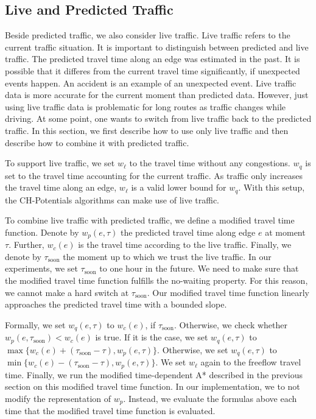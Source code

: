 \documentclass[letterpaper]{article} %
\begin{document}
\subsection{Live and Predicted Traffic}
\label{sec:live-predicted-traffic}

Beside predicted traffic, we also consider live traffic.
Live traffic refers to the current traffic situation.
It is important to distinguish between predicted and live traffic.
The predicted travel time along an edge was estimated in the past.
It is possible that it differes from the current travel time significantly, if unexpected events happen.
An accident is an example of an unexpected event.
Live traffic data is more accurate for the current moment than predicted data.
However, just using live traffic data is problematic for long routes as traffic changes while driving.
At some point, one wants to switch from live traffic back to the predicted traffic.
In this section, we first describe how to use only live traffic and then describe how to combine it with predicted traffic.

To support live traffic, we set $w_\ell$ to the travel time without any congestions.
$w_q$ is set to the travel time accounting for the current traffic.
As traffic only increases the travel time along an edge, $w_\ell$ is a valid lower bound for $w_q$.
With this setup, the CH-Potentials algorithms can make use of live traffic.

To combine live traffic with predicted traffic, we define a modified travel time function.
Denote by $w_p(e,\tau)$ the predicted travel time along edge $e$ at moment $\tau$.
Further, $w_c(e)$ is the travel time according to the live traffic.
Finally, we denote by $\tau_{\mathrm{soon}}$ the moment up to which we trust the live traffic.
In our experiments, we set $\tau_{\mathrm{soon}}$ to one hour in the future.
We need to make sure that the modified travel time function fulfills the no-waiting property.
For this reason, we cannot make a hard switch at $\tau_{\mathrm{soon}}$.
Our modified travel time function linearly approaches the predicted travel time with a bounded slope.

Formally, we set $w_q(e,\tau)$ to $w_c(e)$, if $\tau_{\mathrm{soon}}$.
Otherwise, we check whether $w_p(e,\tau_{\mathrm{soon}}) < w_c(e)$ is true.
If it is the case, we set $w_q(e,\tau)$ to $\max\{w_c(e)+(\tau_{\mathrm{soon}}-\tau), w_p(e,\tau)\}$.
Otherwise, we set $w_q(e,\tau)$ to $\min\{w_c(e)-(\tau_{\mathrm{soon}}-\tau), w_p(e,\tau)\}$.
We set $w_\ell$ again to the freeflow travel time.
Finally, we run the modified time-dependent A* described in the previous section on this modified travel time function. 
In our implementation, we to not modify the representation of $w_p$.
Instead, we evaluate the formulas above each time that the modified travel time function is evaluated.
\end{document}
